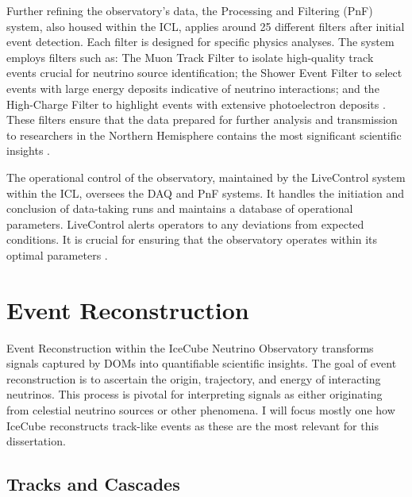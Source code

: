 Further refining the observatory's data, the Processing and Filtering (PnF) system, also housed within the ICL, applies around 25 different filters after initial event detection.
Each filter is designed for specific physics analyses.
The system employs filters such as: The Muon Track Filter to isolate high-quality track events crucial for neutrino source identification;
the Shower Event Filter to select events with large energy deposits indicative of neutrino interactions;
and the High-Charge Filter to highlight events with extensive photoelectron deposits \cite{IC3_thedetector}.
These filters ensure that the data prepared for further analysis and transmission to researchers in the Northern Hemisphere contains the most significant scientific insights \cite{IC3_thedetector}.

The operational control of the observatory, maintained by the LiveControl system within the ICL, oversees the DAQ and PnF systems.
It handles the initiation and conclusion of data-taking runs and maintains a database of operational parameters.
LiveControl alerts operators to any deviations from expected conditions.
It is crucial for ensuring that the observatory operates within its optimal parameters \cite{IC3_thedetector}.

\section{Event Reconstruction}
Event Reconstruction within the IceCube Neutrino Observatory transforms signals captured by DOMs into quantifiable scientific insights.
The goal of event reconstruction is to ascertain the origin, trajectory, and energy of interacting neutrinos.
This process is pivotal for interpreting signals as either originating from celestial neutrino sources or other phenomena.
I will focus mostly one how IceCube reconstructs track-like events as these are the most relevant for this dissertation.

\subsection{Tracks and Cascades}

